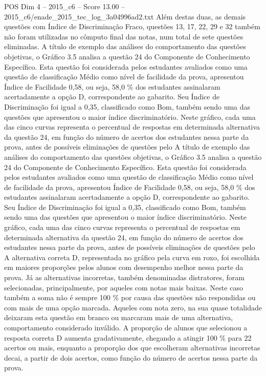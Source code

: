 \begin{textsample}{POS Dim 4 – 2015\_c6 – Score 13.00 – 2015\_c6/enade\_2015\_tec\_log\_3a04996ad2.txt}
Além destas duas, as demais questões com Índice de Discriminação Fraco, questões 13, 17, 22, 29 e 32 também não foram utilizadas no cômputo final das notas, num total de sete questões eliminadas.
A título de exemplo das análises do comportamento das questões objetivas, o Gráfico 3.5 analisa a questão 24 do Componente de Conhecimento Específico.
Esta questão foi considerada pelos estudantes avaliados como uma questão de classificação Médio como nível de facilidade da prova, apresentou Índice de Facilidade 0,58, ou seja, 58,0 \% dos estudantes assinalaram acertadamente a opção D, correspondente ao gabarito.
Seu Índice de Discriminação foi igual a 0,35, classificado como Bom, também sendo uma das questões que apresentou o maior índice discriminatório.
Neste gráfico, cada uma das cinco curvas representa o percentual de respostas em determinada alternativa da questão 24, em função do número de acertos dos estudantes nessa parte da prova, antes de possíveis eliminações de questões pelo A título de exemplo das análises do comportamento das questões objetivas, o Gráfico 3.5 analisa a questão 24 do Componente de Conhecimento Específico.
Esta questão foi considerada pelos estudantes avaliados como uma questão de classificação Médio como nível de facilidade da prova, apresentou Índice de Facilidade 0,58, ou seja, 58,0 \% dos estudantes assinalaram acertadamente a opção D, correspondente ao gabarito.
Seu Índice de Discriminação foi igual a 0,35, classificado como Bom, também sendo uma das questões que apresentou o maior índice discriminatório.
Neste gráfico, cada uma das cinco curvas representa o percentual de respostas em determinada alternativa da questão 24, em função do número de acertos dos estudantes nessa parte da prova, antes de possíveis eliminações de questões pelo A alternativa correta D, representada no gráfico pela curva em roxo, foi escolhida em maiores proporções pelos alunos com desempenho melhor nessa parte da prova.
Já as alternativas incorretas, também denominadas distratores, foram selecionadas, principalmente, por aqueles com notas mais baixas.
Neste caso também a soma não é sempre 100 \% por causa das questões não respondidas ou com mais de uma opção marcada.
Aqueles com nota zero, na sua quase totalidade deixaram esta questão em branco ou marcaram mais de uma alternativa, comportamento considerado inválido.
A proporção de alunos que selecionou a resposta correta D aumenta gradativamente, chegando a atingir 100 \% para 22 acertos ou mais, enquanto a proporção dos que escolheram alternativas incorretas decai, a partir de dois acertos, como função do número de acertos nessa parte da prova.

\end{textsample}
